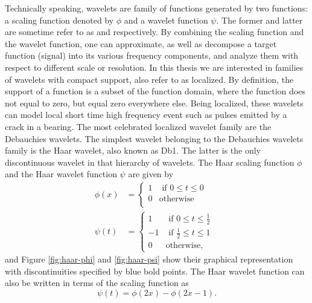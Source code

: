 \documentclass[../Main/thesis.tex]{subfiles}
\begin{document}
\justify
Technically speaking, wavelets are family of functions generated by two functions: a scaling function denoted by $\phi$ and a wavelet function $\psi$. The former and latter are sometime refer to as  and  respectively. By combining the scaling function and the wavelet function, one can approximate, as well as decompose a target function (signal) into its various frequency components, and analyze them with respect to different scale or resolution. In this thesis we are interested in families of wavelets with compact support, also refer to as localized. By definition, the support of a function is a subset of the function domain, where the function does not equal to zero, but equal zero everywhere else. Being localized, these wavelets can model local short time high frequency event such as pulses emitted by a crack in a bearing. The most celebrated localized wavelet family are the Debauchies wavelets. 
\justify
The simplest wavelet belonging to the Debauchies wavelets family is the Haar wavelet, also known as Db1. The latter is the only discontinuous wavelet in that hierarchy of wavelets.
The Haar scaling function $\phi$ and the Haar wavelet function $\psi$ are given by
\begin{equation}\label{eq:haar-wavelet}
\begin{split}
\phi(x) &=
  \begin{cases}
   1 & \text{ if $0 \leq t \le 0$} \\
    0 & \text{otherwise}\\
  \end{cases}\\
\psi(t)& =
  \begin{cases}
   1 & \text{ if $0 \leq t \le \frac{1}{2}$ } \\
    -1 & \text{ if  $\frac{1}{2} \leq t \le 1$ }\\
    0 & \text{otherwise},
  \end{cases}
  \end{split}
\end{equation}
and Figure \ref{fig:haar-phi} and \ref{fig:haar-psi} show their graphical representation with discontinuities specified by blue bold points. The Haar wavelet function can also be written in  terms of the scaling function as 
\begin{equation}
\psi(t) = \phi(2x)-\phi(2x-1) \nonumber.
\end{equation}
\end{document}
